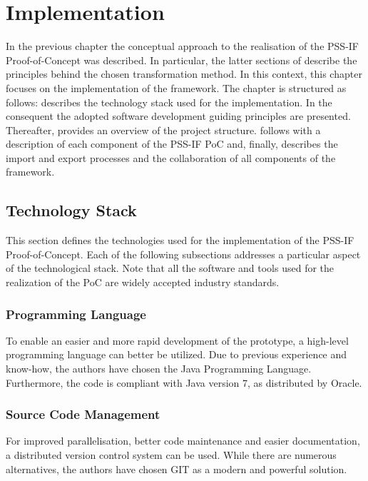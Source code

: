 \chapter{Implementation}
\label{chap:impl}

In the previous chapter the conceptual approach to the realisation of the PSS-IF Proof-of-Concept was described. In particular, the latter sections of  describe the principles behind the chosen transformation method. In this context, this chapter focuses on the implementation of the framework. The chapter is structured as follows:  describes the technology stack used for the implementation. In the consequent  the adopted software development guiding principles are presented. Thereafter,  provides an overview of the project structure.  follows with a description of each component of the PSS-IF PoC and, finally,  describes the import and export processes and the collaboration of all components of the framework.

\section{Technology Stack}
\label{sec:impl:technology}

This section defines the technologies used for the implementation of the PSS-IF Proof-of-Concept. Each of the following subsections addresses a particular aspect of the technological stack. Note that all the software and tools used for the realization of the PoC are widely accepted industry standards.

\subsection{Programming Language}

To enable an easier and more rapid development of the prototype, a high-level programming language can better be utilized. Due to previous experience and know-how, the authors have chosen the Java Programming Language. Furthermore, the code is compliant with Java version 7, as distributed by Oracle. 

\subsection{Source Code Management}

For improved parallelisation, better code maintenance and easier documentation, a distributed version control system can be used. While there are numerous alternatives, the authors have chosen GIT as a modern and powerful solution.

